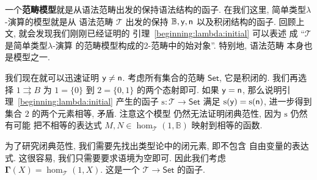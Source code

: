 一个\textbf{范畴模型}就是从语法范畴出发的保持语法结构的函子.
在我们这里, 简单类型\(\lambda\)-演算的模型就是从
语法范畴 \(\mathcal T\) 出发的保持
\(\mathbb B,\textnormal{\textsf{y}},\textnormal{\textsf{n}}\)
以及积闭结构的函子. 回顾上文, 就会发现我们刚刚已经证明的
引理~\ref{beginning:lambda:initial} 可以表述
成 “\(\mathcal T\) 是简单类型\(\lambda\)-演算
的范畴模型构成的2-范畴中的始对象”. 特别地, 语法范畴
本身也是模型之一.

我们现在就可以迅速证明 \(\textnormal{\textsf{y}}\ne\textnormal{\textsf{n}}\).
考虑所有集合的范畴 \(\mathsf{Set}\), 它是积闭的.
我们再选择 \(1 \rightrightarrows B\) 为
\(1=\{0\}\) 到 \(2=\{0, 1\}\) 的两个态射即可.
如果 \(\textnormal{\textsf{y}}=\textnormal{\textsf{n}}\),
那么说明引理~\ref{beginning:lambda:initial} 产生的函子
\(\mathrm s:\mathcal T \to \mathsf{Set}\)
满足 \(\mathrm{s}(\textnormal{\textsf{y}}) = \mathrm{s}(\textnormal{\textsf{n}})\),
进一步得到集合 \(2\) 的两个元素相等, 矛盾. 注意这个模型
仍然无法证明闭典范性, 因为 \(\mathrm{s}\) 仍然有可能
把不相等的表达式 \(M,N \in
\hom_{\mathcal T}(1, \mathbb B)\)
映射到相等的函数.

为了研究闭典范性, 我们需要先找出类型论中的闭元素, 即不包含
自由变量的表达式. 这很容易, 我们只需要要求语境为空即可.
因此我们考虑 \(\boldsymbol\Gamma(X) = \hom_{\mathcal T}(1, X)\).
这是一个 \(\mathcal T \to \mathsf{Set}\) 的函子.

